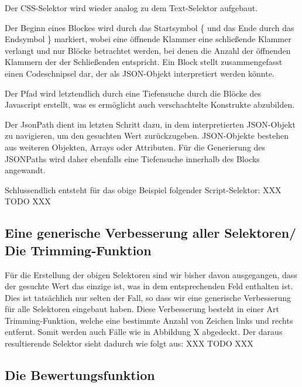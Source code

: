 Der CSS-Selektor wird wieder analog zu dem Text-Selektor aufgebaut.

Der Beginn eines Blockes wird durch das Startsymbol \{ und das Ende durch das Endsymbol \} markiert, wobei eine
öffnende Klammer eine schließende Klammer verlangt und nur Blöcke betrachtet werden, bei denen die Anzahl der
öffnenden Klammern der der Schließenden entspricht.
Ein Block stellt zusammengefasst einen Codeschnipsel dar, der als JSON-Objekt interpretiert werden könnte.

Der Pfad wird letztendlich durch eine Tiefensuche durch die Blöcke des Javascript erstellt, was es ermöglicht auch
verschachtelte Konstrukte abzubilden.

Der JsonPath dient im letzten Schritt dazu, in dem interpretierten JSON-Objekt zu navigieren, um den gesuchten Wert
zurückzugeben.
JSON-Objekte bestehen aus weiteren Objekten, Arrays oder Attributen.
Für die Generierung des JSONPaths wird daher ebenfalls eine Tiefensuche innerhalb des Blocks angewandt.

Schlussendlich entsteht für das obige Beispiel folgender Script-Selektor:
XXX TODO XXX

\subsection{Eine generische Verbesserung aller Selektoren/ Die Trimming-Funktion}
\label{subsec:generische-verbesserung}

Für die Erstellung der obigen Selektoren sind wir bisher davon ausgegangen, dass der gesuchte Wert das einzige ist,
was in dem entsprechenden Feld enthalten ist.
Dies ist tatsächlich nur selten der Fall, so dass wir eine generische Verbesserung für alle Selektoren eingebaut haben.
Diese Verbesserung besteht in einer Art Trimming-Funktion, welche eine bestimmte Anzahl von Zeichen links und rechts
entfernt.
Somit werden auch Fälle wie in Abbildung X abgedeckt.
Der daraus resultierende Selektor sieht dadurch wie folgt aus:
XXX TODO XXX

\subsection{Die Bewertungsfunktion}
\label{subsec:bewertungsfunktion}

